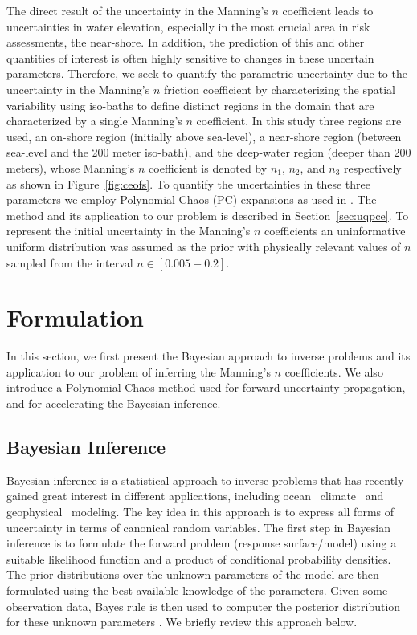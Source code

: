 \documentclass[review,12pt]{elsarticle}
\begin{document}
The direct result of the uncertainty in the Manning's $n$ coefficient leads to
uncertainties in water elevation,
especially in the most crucial area in risk assessments, the near-shore. In 
addition,  the prediction of this and other quantities of interest is often highly 
sensitive to changes in these uncertain parameters.  Therefore, we seek to 
quantify the parametric uncertainty due to the uncertainty in the Manning's $n$ 
friction coefficient by characterizing the spatial variability using
iso-baths to define distinct regions in the domain that are characterized by a
single Manning's $n$ coefficient.  In this study three regions are used, an
on-shore region (initially above sea-level), a near-shore region (between
sea-level and the 200 meter iso-bath), and the deep-water region (deeper than
200 meters), whose Manning's $n$ coefficient is denoted by $n_1$, $n_2$, and $n_3$ respectively 
as shown in Figure~\ref{fig:ceofs}. To quantify the uncertainties
in these three parameters we employ Polynomial Chaos (PC) 
expansions as used in \cite{sraj:2013a,sraj:2013b}.  The method and its 
application to our problem is
described in Section~\ref{sec:uqpce}.  To represent the initial uncertainty in the
Manning's $n$ coefficients an uninformative uniform distribution was assumed as 
the prior with physically relevant values of $n$ sampled from the interval 
$n \in [0.005-0.2]$.
\section{Formulation}
\label{sec:formu}
In this section, we first present the Bayesian approach to inverse problems 
and its application to our problem of inferring the Manning's $n$ coefficients.
We also introduce
a Polynomial Chaos method used for forward uncertainty propagation, and 
for accelerating the Bayesian inference.
\subsection{Bayesian Inference}
 \label{sec:inference}
 
Bayesian inference is a statistical approach to inverse problems
that has recently gained great interest in different applications, including
ocean~\citep{Alexagnderian2011a,Zedler2012,sraj:2013a}
climate~\citep{OlsonEtAl2012} and geophysical~\citep{Malinverno2002} modeling.
The key idea in this approach is to express all forms of uncertainty
in terms of canonical random variables. The first step in Bayesian inference 
is to formulate the forward problem (response surface/model) using 
a suitable likelihood function and a product of conditional probability densities. 
The prior distributions over the unknown parameters of the model
are then formulated using the best available knowledge of the parameters.  Given some observation data, Bayes rule 
is then used to computer the posterior distribution for these unknown parameters
\citep{sivia}. We briefly review this approach below.
\end{document}
